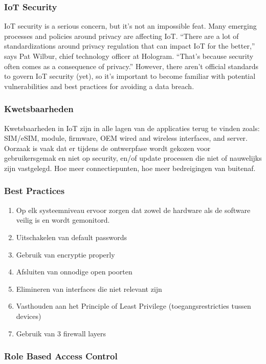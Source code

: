 \subsubsection{IoT Security}
IoT security is a serious concern, but it’s not an impossible feat. Many emerging processes and policies around privacy are affecting IoT.
“There are a lot of standardizations around privacy regulation that can impact IoT for the better,” says Pat Wilbur, chief technology officer at Hologram. “That’s because security often comes as a consequence of privacy.”
However, there aren’t official standards to govern IoT security (yet), so it’s important to become familiar with potential vulnerabilities and best practices for avoiding a data breach.

\subsubsection{Kwetsbaarheden}
Kwetsbaarheden in IoT zijn in alle lagen van de applicaties  terug te vinden zoals: SIM/eSIM, module, firmware, OEM wired and wireless interfaces, and server. Oorzaak is vaak dat er tijdens de ontwerpfase wordt gekozen voor gebruikersgemak en niet op security, en/of update processen die niet of nauwelijks zijn vastgelegd.
Hoe meer connectiepunten, hoe meer bedreigingen van buitenaf.

\subsubsection{Best Practices}

\begin{enumerate}
	\item  Op elk systeemniveau ervoor zorgen dat zowel de hardware als de software veilig is en wordt gemonitord. 
	
	\item Uitschakelen van default passwords
	\item Gebruik van encryptie properly
	\item Afsluiten van onnodige open poorten
	
	\item Elimineren van interfaces die niet relevant zijn
	\item Vasthouden aan het Principle of Least Privilege (toegangsrestricties tussen devices)
	\item Gebruik van 3 firewall layers
	
\end{enumerate}
\subsubsection{Role Based Access Control}




